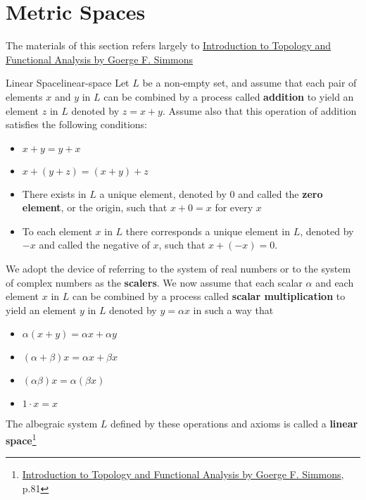 \section{Metric Spaces}

\begin{tcolorbox}[enhanced,arc=3mm,boxrule=1.5mm,
    frame hidden,colback=blue!10!white,
    borderline={1mm}{0mm}{blue,dotted} ]
    The materials of this section refers largely to
    \href{https://trello.com/c/3EPccNTa}{Introduction to Topology and Functional Analysis by Goerge F. Simmons}
\end{tcolorbox}

\begin{Definition}{Linear Space}{linear-space}
    Let $L$ be a non-empty set, and assume that each pair of elements $x$ and $y$ in $L$ can be combined by a process
    called \textbf{addition} to yield an element $z$ in $L$ denoted by $z = x + y$. Assume also that this operation of
    addition satisfies the following conditions:

    \begin{itemize}
        \item $x + y = y + x$
        \item $x + (y + z) = (x + y) + z$
        \item There exists in $L$ a unique element, denoted by $0$ and called the \textbf{zero element}, or the origin,
              such that $x + 0 = x$ for every $x$
        \item To each element $x$ in $L$ there corresponds a unique element in $L$, denoted by $-x$ and called the
              negative of $x$, such that $x + (-x) = 0$.
    \end{itemize}

    We adopt the device of referring to the system of real numbers or to the system of complex numbers as the
    \textbf{scalers}. We now assume that each scalar $\alpha$ and each element $x$ in $L$ can be combined by a process
    called \textbf{scalar multiplication} to yield an element $y$ in $L$ denoted by $y = \alpha x$ in such a way that

    \begin{itemize}
        \item $\alpha(x + y) = \alpha x + \alpha y$
        \item $(\alpha + \beta)x = \alpha x + \beta x$
        \item $(\alpha\beta)x = \alpha(\beta x)$
        \item $1 \cdot x = x$
    \end{itemize}

    The albegraic system $L$ defined by these operations and axioms is called a
    \textbf{linear space}\footnote{\href{https://trello.com/c/3EPccNTa}{Introduction to Topology and Functional Analysis by Goerge F. Simmons}, p.81}
\end{Definition}

